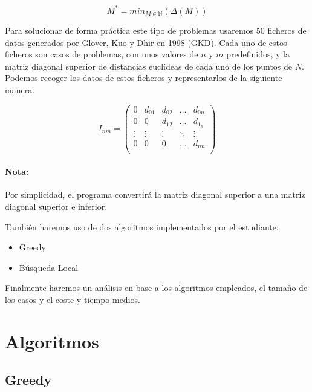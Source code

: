\documentclass{article}
\begin{document}
    \begin{equation*}
        M^* = min_{M \in \mathbb{M}}(\Delta(M))
    \end{equation*}

    Para solucionar de forma práctica este tipo de problemas usaremos 50 ficheros de datos generados por
    Glover, Kuo y Dhir en 1998 (GKD). Cada uno de estos ficheros son casos de problemas, con unos valores
    de $n$ y $m$ predefinidos, y la matriz diagonal superior de distancias euclídeas de cada uno de los
    puntos de $N$. Podemos recoger los datos de estos ficheros y representarlos de la siguiente manera.

    \begin{equation*}
        I_{nm} =
        \begin{pmatrix}
            0 & d_{01} & d_{02} & \dots & d_{0n} \\
            0 & 0 & d_{12} & \dots & d_{1_n} \\
            \vdots & \vdots & \vdots & \ddots & \vdots \\
            0 & 0 & 0 & \dots & d_{nn} \\
        \end{pmatrix}
    \end{equation*}

    \paragraph*{\textbf{Nota:}}Por simplicidad, el programa convertirá la matriz diagonal superior a una matriz diagonal superior e inferior.

    \vspace*{0.1in}
    También haremos uso de dos algoritmos implementados por el estudiante:
    \begin{itemize}
        \item Greedy
        \item Búsqueda Local
    \end{itemize}

    Finalmente haremos un análisis en base a los algoritmos empleados, el tamaño de los casos y el coste y tiempo medios.

    \pagebreak

    \section{Algoritmos}

    \subsection{Greedy}
\end{document}
